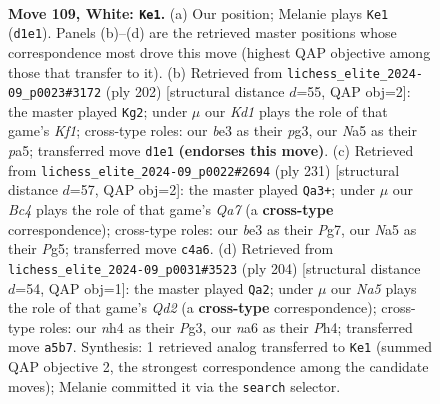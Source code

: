 \documentclass[11pt]{article}
\begin{document}
\clearpage

\begin{figure}[p]\centering
\begin{subfigure}{0.46\textwidth}\centering
\resizebox{\linewidth}{!}{%
\newchessgame
\chessboard[
  setfen={8/6k1/n7/N7/PpB1P2n/4b3/1q5p/3K4 w - - 10 109},
  showmover=false,
  pgfstyle=straightmove, color=movearrow, markmove={d1-e1}
]}
\caption{}
\end{subfigure}\hfill
\begin{subfigure}{0.46\textwidth}\centering
\resizebox{\linewidth}{!}{%
\newchessgame
\chessboard[
  setfen={8/8/8/p7/P4k2/4q1pP/8/3B1K2 w - - 4 102},
  showmover=false,
  pgfstyle=straightmove, color=movearrow, markmove={f1-g2}
]}
\caption{}
\end{subfigure}
\\[4pt]
\begin{subfigure}{0.46\textwidth}\centering
\resizebox{\linewidth}{!}{%
\newchessgame
\chessboard[
  setfen={3Q4/4P1pk/3K4/6p1/3p4/8/q7/8 b - - 25 116},
  showmover=false,
  pgfstyle=straightmove, color=movearrow, markmove={a2-a3}
]}
\caption{}
\end{subfigure}\hfill
\begin{subfigure}{0.46\textwidth}\centering
\resizebox{\linewidth}{!}{%
\newchessgame
\chessboard[
  setfen={8/4k3/2q3p1/Pp5p/7P/6P1/3Q4/6K1 w - - 32 103},
  showmover=false,
  pgfstyle=straightmove, color=movearrow, markmove={d2-a2}
]}
\caption{}
\end{subfigure}
\caption{\textbf{Move 109, White: \texttt{Ke1}.} (a) Our position; Melanie plays \texttt{Ke1} (\texttt{d1e1}). Panels (b)--(d) are the retrieved master positions whose correspondence most drove this move (highest QAP objective among those that transfer to it). (b) Retrieved from \texttt{lichess\_elite\_2024-09\_p0023\#3172} (ply 202) [structural distance $d$=55, QAP obj=2]: the master played \texttt{Kg2}; under $\mu$ our \emph{Kd1} plays the role of that game's \emph{Kf1}; cross-type roles: our \emph{b}e3 as their \emph{p}g3, our \emph{N}a5 as their \emph{p}a5; transferred move \texttt{d1e1} \textbf{(endorses this move)}. (c) Retrieved from \texttt{lichess\_elite\_2024-09\_p0022\#2694} (ply 231) [structural distance $d$=57, QAP obj=2]: the master played \texttt{Qa3+}; under $\mu$ our \emph{Bc4} plays the role of that game's \emph{Qa7} (a \textbf{cross-type} correspondence); cross-type roles: our \emph{b}e3 as their \emph{P}g7, our \emph{N}a5 as their \emph{P}g5; transferred move \texttt{c4a6}. (d) Retrieved from \texttt{lichess\_elite\_2024-09\_p0031\#3523} (ply 204) [structural distance $d$=54, QAP obj=1]: the master played \texttt{Qa2}; under $\mu$ our \emph{Na5} plays the role of that game's \emph{Qd2} (a \textbf{cross-type} correspondence); cross-type roles: our \emph{n}h4 as their \emph{P}g3, our \emph{n}a6 as their \emph{P}h4; transferred move \texttt{a5b7}. Synthesis: 1 retrieved analog transferred to \texttt{Ke1} (summed QAP objective 2, the strongest correspondence among the candidate moves); Melanie committed it via the \texttt{search} selector.}
\label{fig:thought-m216}
\end{figure}
\end{document}
